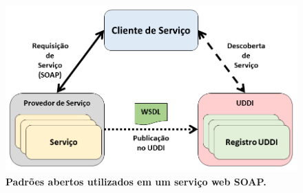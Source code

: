 

\begin{figure}[h]
    \includegraphics[scale=0.5]{2-fundamentacao-teorica/imagens/arquitetura-orientada-a-servicos(4).png}
    \centering
    \caption[Padrões abertos utilizados em um serviço web SOAP.]{\textbf{Padrões abertos utilizados em um serviço web SOAP.}}
    \label{fig:soap}
\end{figure}


